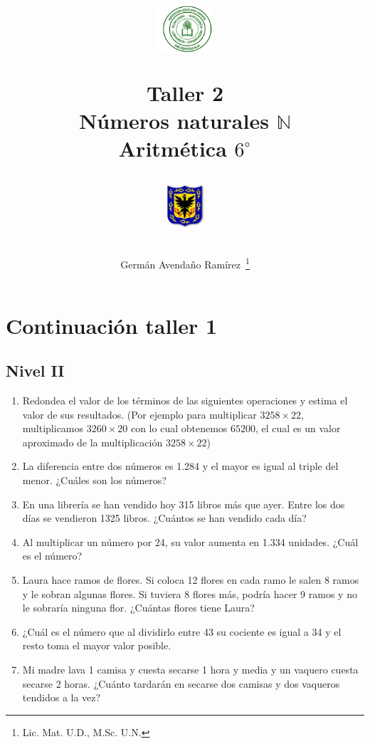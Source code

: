 \documentclass[twoside]{article}
\author{Germ\'an Avenda\~no Ram\'irez~\thanks{Lic. Mat. U.D., M.Sc. U.N.}}
\title{\begin{minipage}{.2\textwidth}
\includegraphics[height=1.75cm]{Images/logo-colegio.png}\end{minipage}
\begin{minipage}{.55\textwidth}
\begin{center}
Taller 2\\
Números naturales $\mathbb{N}$\\
Aritmética $6^{\circ}$
\end{center}
\end{minipage}\hfill
\begin{minipage}{.2\textwidth}
\includegraphics[height=1.75cm]{Images/logo-sed.png} 
\end{minipage}}
\date{}
\begin{document}
\maketitle
\begin{minipage}{.95\textwidth}
\end{minipage}
\section*{Continuación taller 1}
\subsection*{Nivel II}
\begin{enumerate}
\item Redondea el valor de los términos de las siguientes operaciones y estima el valor de sus resultados. (Por ejemplo para multiplicar $3258\times 22$, multiplicamos $3260\times 20$ con lo cual obtenemos $65200$, el cual es un valor aproximado de la multiplicación $3258\times 22$)
\begin{enumerate}
\end{enumerate}
\item La diferencia entre dos números es 1.284 y el mayor es igual al triple del menor. ¿Cuáles son los números?
\item En una librería se han vendido hoy 315 libros más que ayer. Entre los dos días se vendieron 1325 libros. ¿Cuántos se han vendido cada día?
\item Al multiplicar un número por 24, su valor aumenta en 1.334 unidades. ¿Cuál es el número?
\item Laura hace ramos de flores. Si coloca 12 flores en cada ramo le salen 8 ramos y le sobran algunas flores. Si tuviera 8 flores más, podría hacer 9 ramos y no le sobraría ninguna flor. ¿Cuántas flores tiene Laura?
\item ¿Cuál es el número que al dividirlo entre 43 su cociente es igual a 34 y el resto toma el mayor valor posible.
\item Mi madre lava 1 camisa y cuesta secarse 1 hora y media y un vaquero cuesta secarse 2 horas. ¿Cuánto tardarán en secarse dos camisas y dos vaqueros tendidos a la vez?
\end{enumerate}
\end{document}
